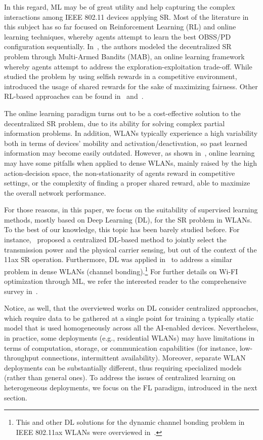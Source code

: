 \documentclass[10pt,a4paper,twocolumn]{article}
\newcommand{\ITUpar}{\vspace{8pt}\par}
\begin{document}
In this regard, ML may be of great utility and help capturing the complex interactions among IEEE 802.11 devices applying SR. Most of the literature in this subject has so far focused on Reinforcement Learning (RL) and online learning techniques, whereby agents attempt to learn the best OBSS/PD configuration sequentially. In~\cite{wilhelmi2019collaborative, wilhelmi2019potential}, the authors modeled the decentralized SR problem through Multi-Armed Bandits (MAB), an online learning framework whereby agents attempt to address the exploration-exploitation trade-off. While~\cite{wilhelmi2019collaborative} studied the problem by using selfish rewards in a competitive environment,~\cite{wilhelmi2019potential} introduced the usage of shared rewards for the sake of maximizing fairness. Other RL-based approaches can be found in~\cite{bardou2021improving} and~\cite{yin2019learning}.\ITUpar

The online learning paradigm turns out to be a cost-effective solution to the decentralized SR problem, due to its ability for solving complex partial information problems. In addition, WLANs typically experience a high variability both in terms of devices' mobility and activation/deactivation, so past learned information may become easily outdated. However, as shown in~\cite{wilhelmi2019potential}, online learning may have some pitfalls when applied to dense WLANs, mainly raised by the high action-decision space, the non-stationarity of agents reward in competitive settings, or the complexity of finding a proper shared reward, able to maximize the overall network performance.\ITUpar

For those reasons, in this paper, we focus on the suitability of supervised learning methods, mostly based on Deep Learning (DL), for the SR problem in WLANs. To the best of our knowledge, this topic has been barely studied before. For instance,~\cite{jamil2016novel} proposed a centralized DL-based method to jointly select the transmission power and the physical carrier sensing, but out of the context of the 11ax SR operation. Furthermore, DL was applied in~\cite{soto2021atari} to address a similar problem in dense WLANs (channel bonding).\footnote{This and other DL solutions for the dynamic channel bonding problem in IEEE 802.11ax WLANs were overviewed in~\cite{wilhelmi2021machine}.}  For further details on Wi-FI optimization through ML, we refer the interested reader to the comprehensive survey in~\cite{szott2021wifi}.\ITUpar

Notice, as well, that the overviewed works on DL consider centralized approaches, which require data to be gathered at a single point for training a typically static model that is used homogeneously across all the AI-enabled devices. Nevertheless, in practice, some deployments (e.g., residential WLANs) may have limitations in terms of computation, storage, or communication capabilities (for instance, low-throughput connections, intermittent availability). Moreover, separate WLAN deployments can be substantially different, thus requiring specialized models (rather than general ones). To address the issues of centralized learning on heterogeneous deployments, we focus on the FL paradigm, introduced in the next section.\ITUpar
\end{document}
